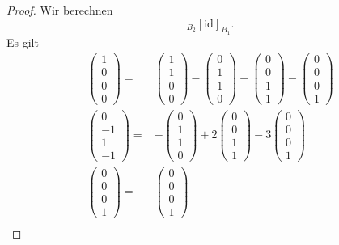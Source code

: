 \begin{proof}
	Wir berechnen
	\[
		_{B_2}[\text{id}]_{B_1}
	.\] 
	Es gilt
	\begin{align*}
		\begin{pmatrix} 1 \\ 0 \\ 0 \\ 0 \end{pmatrix} =&\begin{pmatrix} 1 \\ 1 \\ 0 \\ 0 \end{pmatrix} -\begin{pmatrix} 0 \\ 1 \\ 1 \\ 0 \end{pmatrix} +\begin{pmatrix} 0 \\ 0 \\ 1 \\ 1 \end{pmatrix} -\begin{pmatrix} 0 \\ 0 \\ 0 \\1  \end{pmatrix} \\
		\begin{pmatrix}  0 \\ -1 \\ 1 \\ -1 \end{pmatrix} =& -\begin{pmatrix} 0 \\ 1 \\ 1 \\ 0 \end{pmatrix} +2\begin{pmatrix}  0 \\ 0 \\ 1 \\ 1 \end{pmatrix} -3\begin{pmatrix} 0 \\ 0 \\ 0 \\ 1 \end{pmatrix}\\ 
		\begin{pmatrix} 0 \\ 0 \\ 0 \\ 1 \end{pmatrix} =& \begin{pmatrix} 0 \\ 0 \\ 0 \\ 1 \end{pmatrix} \\

\end{align*}
\end{proof}
